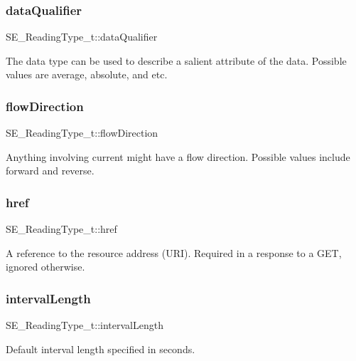 \subsubsection{\texorpdfstring{data\+Qualifier}{dataQualifier}}
{\footnotesize\ttfamily S\+E\+\_\+\+Reading\+Type\+\_\+t\+::data\+Qualifier}

The data type can be used to describe a salient attribute of the data. Possible values are average, absolute, and etc. \mbox{\label{group__ReadingType_ga13cc7653b3ac0633618440d2ad240aa0}} 
\subsubsection{\texorpdfstring{flow\+Direction}{flowDirection}}
{\footnotesize\ttfamily S\+E\+\_\+\+Reading\+Type\+\_\+t\+::flow\+Direction}

Anything involving current might have a flow direction. Possible values include forward and reverse. \mbox{\label{group__ReadingType_gaab72122e2abf41553e43032788338e3e}} 
\subsubsection{\texorpdfstring{href}{href}}
{\footnotesize\ttfamily S\+E\+\_\+\+Reading\+Type\+\_\+t\+::href}

A reference to the resource address (U\+RI). Required in a response to a G\+ET, ignored otherwise. \mbox{\label{group__ReadingType_ga27fb2c72d4c94d8e2b9ddd66ac40b089}} 
\subsubsection{\texorpdfstring{interval\+Length}{intervalLength}}
{\footnotesize\ttfamily S\+E\+\_\+\+Reading\+Type\+\_\+t\+::interval\+Length}

Default interval length specified in seconds. \mbox{\label{group__ReadingType_ga9b4451c6dfbfd971677fe48371e3190c}} 
